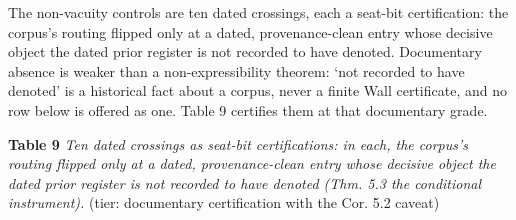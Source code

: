 \documentclass[10pt]{article}
\renewcommand{\_}{\origunderscore\allowbreak}
\begin{document}
The non-vacuity controls are ten dated crossings, each a seat-bit
certification: the corpus's routing flipped only at a dated,
provenance-clean entry whose decisive object the dated prior register is
not recorded to have denoted. Documentary absence is weaker than a
non-expressibility theorem: `not recorded to have denoted' is a
historical fact about a corpus, never a finite Wall certificate, and no
row below is offered as one. Table 9 certifies them at that documentary
grade.

\textbf{Table 9 \textbar{}} \emph{Ten dated crossings as seat-bit
certifications: in each, the corpus's routing flipped only at a dated,
provenance-clean entry whose decisive object the dated prior register is
not recorded to have denoted (Thm. 5.3 the conditional instrument).}
(tier: documentary certification with the Cor. 5.2 caveat)
\end{document}
